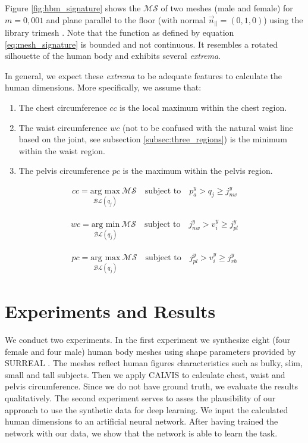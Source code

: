 \documentclass[runningheads, orivec]{llncs}
\begin{document}
Figure \ref{fig:hbm_signature} shows the $\mathcal{MS}$ of two meshes (male 
and female) for 
$m=0,001$ and plane parallel to the floor (with normal 
$\vec{n}_{||} = (0, 
1,0)$) using the library trimesh \cite{trimesh}. Note that the function as 
defined by equation \ref{eq:mesh_signature} is bounded and not continuous. It 
resembles a rotated silhouette of the human body and exhibits several 
\textit{extrema}.

In general, we expect these \textit{extrema} to be adequate features to 
calculate the human dimensions. More specifically, we assume that:
\begin{enumerate}
	\item The chest circumference $cc$ is the local maximum within the chest 
	region.
	\item The waist circumference $wc$ (not to be confused with the natural 
	waist line based on the joint, see subsection \ref{subsec:three_regions}) 
	is the minimum within the waist region.	
	\item The pelvis circumference $pc$ is the maximum within the pelvis region.
\end{enumerate}

\begin{align}\label{eq:cc}
cc = \underset{\mathcal{BL}(q_j)}{\text{arg max}}\ \mathcal{MS} \quad 
\text{subject 
to} \quad p^y_a > q_j \geq j^y_{nw}
\end{align}

\begin{align}\label{eq:wc}
wc = \underset{\mathcal{BL}(q_j)}{\text{arg min}}\ \mathcal{MS} \quad 
\text{subject 
	to} \quad j^y_{nw} > v^y_i \geq j^y_{pl}
\end{align}

\begin{align}\label{eq:pc}
pc = \underset{\mathcal{BL}(q_j)}{\text{arg max}}\ \mathcal{MS} \quad 
\text{subject 
	to} \quad j^y_{pl} > v^y_i \geq j^y_{rh}
\end{align}

\section{Experiments and Results}

We conduct two experiments. In the first experiment we synthesize eight (four 
female and four male) human body meshes using shape parameters provided by 
SURREAL \cite{varol17_surreal}.
The meshes reflect human figures characteristics such as bulky, slim, small and 
tall subjects. Then we apply CALVIS to calculate chest, waist and pelvis 
circumference. Since we do not have ground truth, we evaluate the results 
qualitatively.
The second 
experiment serves to asses the plausibility of our approach to use the 
synthetic data for deep learning. We input the calculated human 
dimensions to an artificial neural network. After having trained the network 
with our data, we show that the network is able to learn the task.
\end{document}
